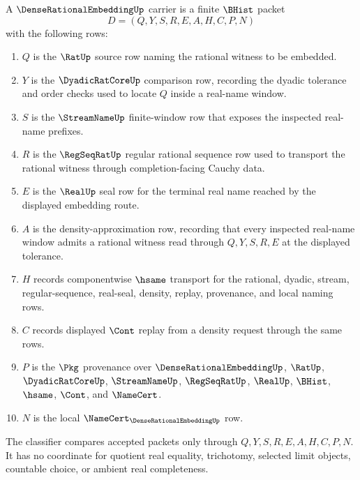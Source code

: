\begin{definition}
\label{def:dense-rational-embedding-carrier}
A $\DenseRationalEmbeddingUp$ carrier is a finite $\BHist$ packet
$$
D=(Q,Y,S,R,E,A,H,C,P,N)
$$
with the following rows:
\begin{enumerate}
\item $Q$ is the $\RatUp$ source row naming the rational witness to be embedded.
\item $Y$ is the $\DyadicRatCoreUp$ comparison row, recording the dyadic tolerance and order checks used to locate $Q$ inside a real-name window.
\item $S$ is the $\StreamNameUp$ finite-window row that exposes the inspected real-name prefixes.
\item $R$ is the $\RegSeqRatUp$ regular rational sequence row used to transport the rational witness through completion-facing Cauchy data.
\item $E$ is the $\RealUp$ seal row for the terminal real name reached by the displayed embedding route.
\item $A$ is the density-approximation row, recording that every inspected real-name window admits a rational witness read through $Q,Y,S,R,E$ at the displayed tolerance.
\item $H$ records componentwise $\hsame$ transport for the rational, dyadic, stream, regular-sequence, real-seal, density, replay, provenance, and local naming rows.
\item $C$ records displayed $\Cont$ replay from a density request through the same rows.
\item $P$ is the $\Pkg$ provenance over $\DenseRationalEmbeddingUp$, $\RatUp$, $\DyadicRatCoreUp$, $\StreamNameUp$, $\RegSeqRatUp$, $\RealUp$, $\BHist$, $\hsame$, $\Cont$, and $\NameCert$.
\item $N$ is the local $\NameCert_{\DenseRationalEmbeddingUp}$ row.
\end{enumerate}
The classifier compares accepted packets only through $Q,Y,S,R,E,A,H,C,P,N$. It has no coordinate for quotient real equality, trichotomy, selected limit objects, countable choice, or ambient real completeness.
\end{definition}

